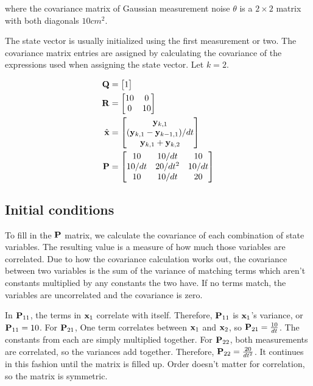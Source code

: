 where the covariance matrix of Gaussian measurement noise $\theta$ is a
$2 \times 2$ matrix with both diagonals $10 cm^2$.

The \gls{state} vector is usually initialized using the first measurement or
two. The covariance matrix entries are assigned by calculating the covariance of
the expressions used when assigning the state vector. Let $k = 2$.

\begin{align}
  \mathbf{Q} &= \begin{bmatrix}1\end{bmatrix} \\
  \mathbf{R} &=
  \begin{bmatrix}
    10 & 0 \\
    0 & 10
  \end{bmatrix} \\
  \hat{\mathbf{x}} &=
  \begin{bmatrix}
    \mathbf{y}_{k,1} \\
    (\mathbf{y}_{k,1} - \mathbf{y}_{k-1,1})/dt \\
    \mathbf{y}_{k,1} + \mathbf{y}_{k,2}
  \end{bmatrix} \\
  \mathbf{P} &=
  \begin{bmatrix}
    10 & 10/dt & 10 \\
    10/dt & 20/dt^2 & 10/dt \\
    10 & 10/dt & 20
  \end{bmatrix}
\end{align}

\subsection{Initial conditions}

To fill in the $\mathbf{P}$ matrix, we calculate the covariance of each combination
of \gls{state} variables. The resulting value is a measure of how much those
variables are correlated. Due to how the covariance calculation works out, the
covariance between two variables is the sum of the variance of matching terms
which aren't constants multiplied by any constants the two have. If no terms
match, the variables are uncorrelated and the covariance is zero.

In $\mathbf{P}_{11}$, the terms in $\mathbf{x}_1$ correlate with itself. Therefore,
$\mathbf{P}_{11}$ is $\mathbf{x}_1$'s variance, or $\mathbf{P}_{11} = 10$. For
$\mathbf{P}_{21}$, One term correlates between $\mathbf{x}_1$ and $\mathbf{x}_2$, so
$\mathbf{P}_{21} = \frac{10}{dt}$. The constants from each are simply multiplied
together. For $\mathbf{P}_{22}$, both measurements are correlated, so the variances
add together. Therefore, $\mathbf{P}_{22} = \frac{20}{dt^2}$. It continues in this
fashion until the matrix is filled up. Order doesn't matter for correlation, so
the matrix is symmetric.

